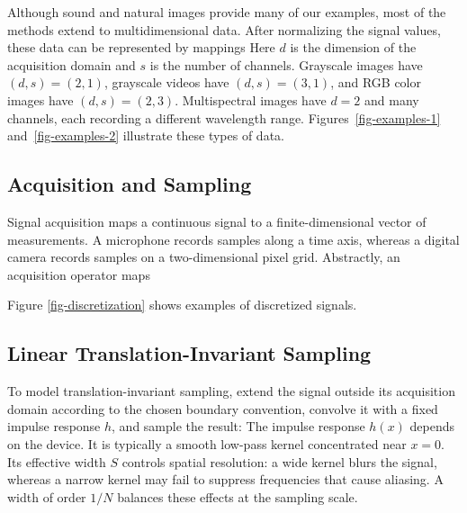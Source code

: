 Although sound and natural images provide many of our examples, most of the methods extend to multidimensional data. After normalizing the signal values, these data can be represented by mappings
Here $d$ is the dimension of the acquisition domain and $s$ is the number of channels. Grayscale images have $(d,s)=(2,1)$, grayscale videos have $(d,s)=(3,1)$, and RGB color images have $(d,s)=(2,3)$. Multispectral images have $d=2$ and many channels, each recording a different wavelength range. Figures~\ref{fig-examples-1} and~\ref{fig-examples-2} illustrate these types of data.





\subsection{Acquisition and Sampling}

Signal acquisition maps a continuous signal to a finite-dimensional vector of measurements. A microphone records samples along a time axis, whereas a digital camera records samples on a two-dimensional pixel grid. Abstractly, an acquisition operator maps


Figure \ref{fig-discretization} shows examples of discretized signals.

\subsection{Linear Translation-Invariant Sampling}

To model translation-invariant sampling, extend the signal outside its acquisition domain according to the chosen boundary convention, convolve it with a fixed impulse response $h$, and sample the result:
The impulse response $h(x)$ depends on the device. It is typically a smooth low-pass kernel concentrated near $x=0$. Its effective width $S$ controls spatial resolution: a wide kernel blurs the signal, whereas a narrow kernel may fail to suppress frequencies that cause aliasing. A width of order $1/N$ balances these effects at the sampling scale.

